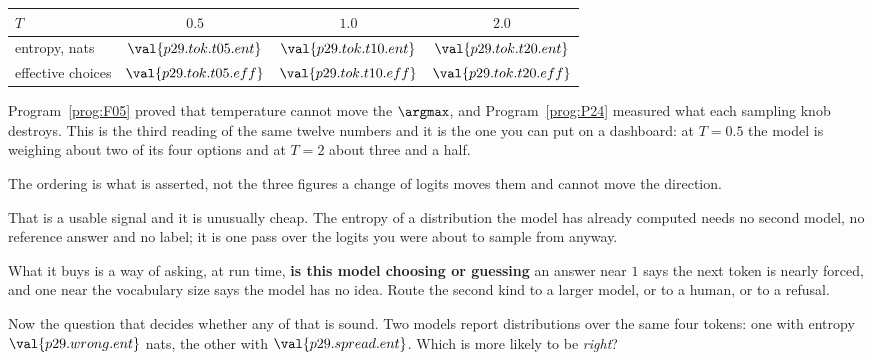 \begin{fr}

\begin{center}
\begin{tabular}{lccc}
\toprule
$T$ & $\num{0.5}$ & $\num{1.0}$ & $\num{2.0}$ \\
\midrule
entropy, nats & $\val{p29.tok.t05.ent}$ & $\val{p29.tok.t10.ent}$
  & $\val{p29.tok.t20.ent}$ \\
effective choices & $\val{p29.tok.t05.eff}$ & $\val{p29.tok.t10.eff}$
  & $\val{p29.tok.t20.eff}$ \\
\bottomrule
\end{tabular}
\end{center}

Program~\ref{prog:F05} proved that temperature cannot move the $\argmax$, and
Program~\ref{prog:P24} measured what each sampling knob destroys. This is the
third reading of the same twelve numbers and it is the one you can put on a
dashboard: at $T = \num{0.5}$ the model is weighing about two of its four
options and at $T = 2$ about three and a half.

The ordering is what is asserted, not the three figures \dash{} a change of
logits moves them and cannot move the direction.
\end{fr}

\begin{fr}
That is a usable signal and it is unusually cheap. The entropy of a
distribution the model has already computed needs no second model, no
reference answer and no label; it is one pass over the logits you were about
to sample from anyway.

What it buys is a way of asking, at run time, \textbf{is this model choosing
or guessing} \dash{} an answer near $1$ says the next token is nearly forced,
and one near the vocabulary size says the model has no idea. Route the second
kind to a larger model, or to a human, or to a refusal.

Now the question that decides whether any of that is sound. Two models report
distributions over the same four tokens: one with entropy
$\val{p29.wrong.ent}$ nats, the other with $\val{p29.spread.ent}$. Which is
more likely to be \emph{right}?
\dotline
\nextframe
\end{fr}

